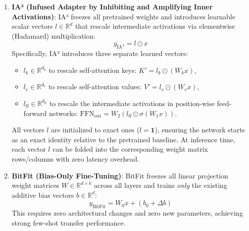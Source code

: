 \documentclass[11pt,a4paper]{article}
\theoremstyle{definition}
\begin{document}
\begin{enumerate}
    \item \textbf{IA³ (Infused Adapter by Inhibiting and Amplifying Inner Activations)}:
    IA³ freezes all pretrained weights and introduces learnable scalar vectors $l \in \mathbb{R}^d$ that rescale intermediate activations via elementwise (Hadamard) multiplication:
    {\boldmath
    \begin{equation}
    y_{\text{IA}^3} = l \odot x
    \end{equation}
    }
    Specifically, IA³ introduces three separate learned vectors:
    \begin{itemize}
        \item $l_k \in \mathbb{R}^{d_k}$ to rescale self-attention keys: $K' = l_k \odot (W_k x)$,
        \item $l_v \in \mathbb{R}^{d_v}$ to rescale self-attention values: $V' = l_v \odot (W_v x)$,
        \item $l_{\text{ff}} \in \mathbb{R}^{d_{\text{ff}}}$ to rescale the intermediate activations in position-wise feed-forward networks: $\text{FFN}_{\text{out}} = W_2 (l_{\text{ff}} \odot \sigma(W_1 x))$.
    \end{itemize}
    All vectors $l$ are initialized to exact ones ($l = \mathbf{1}$), ensuring the network starts as an exact identity relative to the pretrained baseline.
    At inference time, each vector $l$ can be folded into the corresponding weight matrix rows/columns with zero latency overhead.

    \item \textbf{BitFit (Bias-Only Fine-Tuning)}:
    BitFit freezes all linear projection weight matrices $W \in \mathbb{R}^{d \times k}$ across all layers and trains \emph{only} the existing additive bias vectors $b \in \mathbb{R}^d$:
    {\boldmath
    \begin{equation}
    y_{\text{BitFit}} = W_0 x + (b_0 + \Delta b)
    \end{equation}
    }
    This requires zero architectural changes and zero new parameters, achieving strong few-shot transfer performance.
\end{enumerate}
\end{document}

